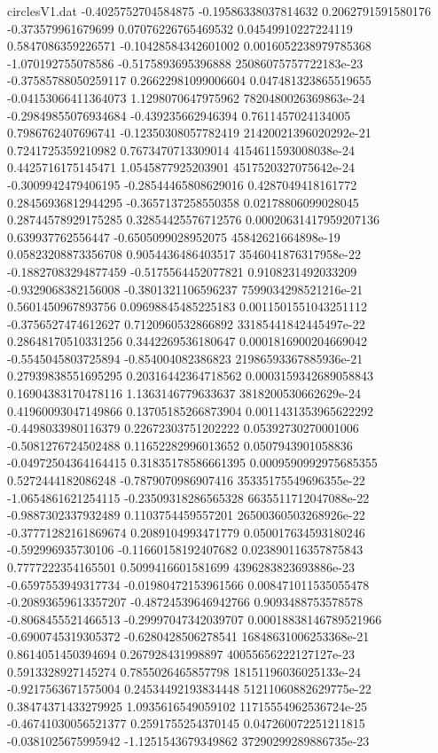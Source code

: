 \begin{filecontents}{circlesV1.dat}
-0.4025752704584875	-0.19586338037814632	0.2062791591580176
-0.373579961679699	0.07076226765469532	0.04549910227224119
0.5847086359226571	-0.10428584342601002	0.0016052238979785368
-1.070192755078586	-0.5175893695396888	25086075757722183e-23
-0.37585788050259117	0.26622981099006604	0.047481323865519655
-0.04153066411364073	1.1298070647975962	7820480026369863e-24
-0.29849855076934684	-0.439235662946394	0.7611457024134005
0.7986762407696741	-0.12350308057782419	21420021396020292e-21
0.7241725359210982	0.7673470713309014	4154611593008038e-24
0.4425716175145471	1.0545877925203901	4517520327075642e-24
-0.3009942479406195	-0.28544465808629016	0.4287049418161772
0.28456936812944295	-0.3657137258550358	0.02178806099028045
0.28744578929175285	0.32854425576712576	0.00020631417959207136
0.639937762556447	-0.6505099028952075	45842621664898e-19
0.05823208873356708	0.9054436486403517	3546041876317958e-22
-0.18827083294877459	-0.5175564452077821	0.9108231492033209
-0.9329068382156008	-0.3801321106596237	7599034298521216e-21
0.5601450967893756	0.09698845485225183	0.0011501551043251112
-0.3756527474612627	0.7120960532866892	33185441842445497e-22
0.28648170510331256	0.3442269536180647	0.0001816900204669042
-0.5545045803725894	-0.854004082386823	21986593367885936e-21
0.27939838551695295	0.20316442364718562	0.0003159342689058843
0.16904383170478116	1.1363146779633637	3818200530662629e-24
0.41960093047149866	0.13705185266873904	0.0011431353965622292
-0.4498033980116379	0.22672303751202222	0.05392730270001006
-0.5081276724502488	0.11652282996013652	0.0507943901058836
-0.04972504364164415	0.31835178586661395	0.0009590992975685355
0.5272444182086248	-0.7879070986907416	35335175549696355e-22
-1.0654861621254115	-0.23509318286565328	6635511712047088e-22
-0.9887302337932489	0.1103754459557201	26500360503268926e-22
-0.37771282161869674	0.2089104993471779	0.050017634593180246
-0.592996935730106	-0.11660158192407682	0.023890116357875843
0.7777222354165501	0.5099416601581699	4396283823693886e-23
-0.6597553949317734	-0.01980472153961566	0.008471011535055478
-0.20893659613357207	-0.48724539646942766	0.9093488753578578
-0.8068455521466513	-0.29997047342039707	0.00018838146789521966
-0.6900745319305372	-0.6280428506278541	16848631006253368e-21
0.8614051450394694	0.267928431998897	40055656222127127e-23
0.5913328927145274	0.7855026465857798	18151196036025133e-24
-0.9217563671575004	0.24534492193834448	51211060882629775e-22
0.38474371433279925	1.0935616549059102	11715554962536724e-25
-0.46741030056521377	0.2591755254370145	0.047260072251211815
-0.0381025675995942	-1.1251543679349862	37290299289886735e-23

\end{filecontents}

